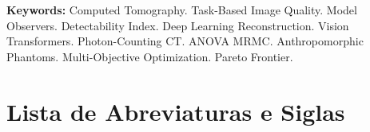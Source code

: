 \documentclass[
  12pt,
  a4paper,
  oneside
]{report}
\begin{document}
\vspace{0.8cm}
\noindent\textbf{Keywords:} Computed Tomography. Task-Based Image Quality. Model Observers. Detectability Index. Deep Learning Reconstruction. Vision Transformers. Photon-Counting CT. ANOVA MRMC. Anthropomorphic Phantoms. Multi-Objective Optimization. Pareto Frontier.
\clearpage

\listoffigures
\clearpage

\listoftables
\clearpage

\chapter*{Lista de Abreviaturas e Siglas}
\end{document}
